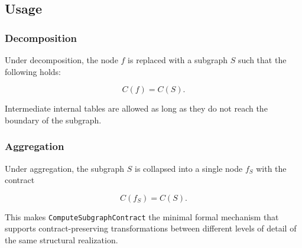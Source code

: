 \subsection{Usage}

\subsubsection{Decomposition}

Under decomposition, the node $f$ is replaced with a subgraph $S$ such that the following holds:


$$C(f) = C(S).$$

Intermediate internal tables are allowed as long as they do not reach the boundary of the subgraph.

\subsubsection{Aggregation}

Under aggregation, the subgraph $S$ is collapsed into a single node $f_S$ with the contract


$$C(f_S) = C(S).$$

This makes \texttt{ComputeSubgraphContract} the minimal formal mechanism that supports contract-preserving transformations between different levels of detail of the same structural realization.
